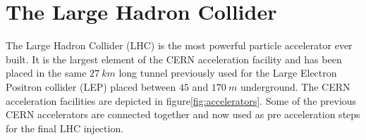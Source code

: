 

\section{The Large Hadron Collider}
The Large Hadron Collider (LHC) is the most powerful particle accelerator ever built.
It is the largest element of the CERN acceleration facility and has been placed in the same $27\ km$ long tunnel previously used for the Large Electron Positron collider (LEP) placed between $45$ and $170\ m$ underground.
The CERN acceleration facilities are depicted in figure\ref{fig:accelerators}.
Some of the previous CERN accelerators are connected together and now used as pre acceleration steps for the final LHC injection.

